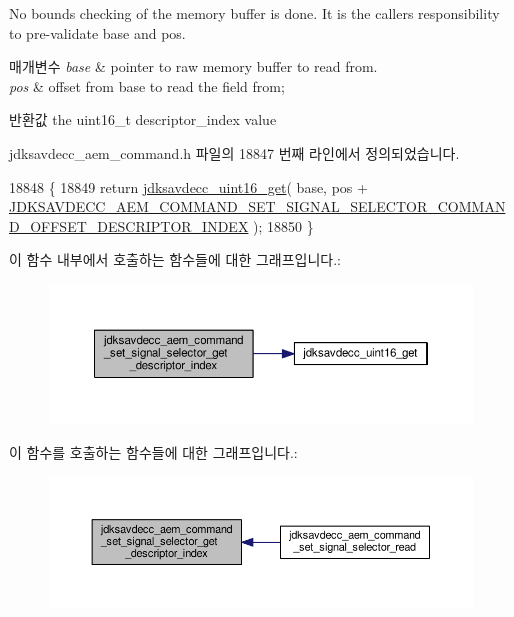 No bounds checking of the memory buffer is done. It is the caller\textquotesingle{}s responsibility to pre-\/validate base and pos.


\begin{DoxyParams}{매개변수}
{\em base} & pointer to raw memory buffer to read from. \\
\hline
{\em pos} & offset from base to read the field from; \\
\hline
\end{DoxyParams}
\begin{DoxyReturn}{반환값}
the uint16\+\_\+t descriptor\+\_\+index value 
\end{DoxyReturn}


jdksavdecc\+\_\+aem\+\_\+command.\+h 파일의 18847 번째 라인에서 정의되었습니다.


\begin{DoxyCode}
18848 \{
18849     \textcolor{keywordflow}{return} \hyperlink{group__endian_ga3fbbbc20be954aa61e039872965b0dc9}{jdksavdecc\_uint16\_get}( base, pos + 
      \hyperlink{group__command__set__signal__selector_ga9fc3bba977c421f1c66b23bc79d6b17e}{JDKSAVDECC\_AEM\_COMMAND\_SET\_SIGNAL\_SELECTOR\_COMMAND\_OFFSET\_DESCRIPTOR\_INDEX}
       );
18850 \}
\end{DoxyCode}


이 함수 내부에서 호출하는 함수들에 대한 그래프입니다.\+:
\nopagebreak
\begin{figure}[H]
\begin{center}
\leavevmode
\includegraphics[width=350pt]{group__command__set__signal__selector_ga8c762e3079314d1001b8193c41049501_cgraph}
\end{center}
\end{figure}




이 함수를 호출하는 함수들에 대한 그래프입니다.\+:
\nopagebreak
\begin{figure}[H]
\begin{center}
\leavevmode
\includegraphics[width=350pt]{group__command__set__signal__selector_ga8c762e3079314d1001b8193c41049501_icgraph}
\end{center}
\end{figure}


